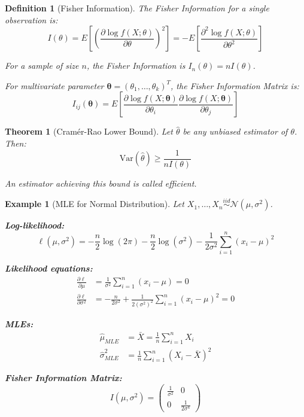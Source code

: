 \documentclass[12pt,a4paper]{article}
\newtheorem{theorem}{Theorem}[section]
\newtheorem{definition}{Definition}[section]
\newtheorem{example}{Example}[section]
\theoremstyle{remark}
\begin{document}
\begin{definition}[Fisher Information]
The Fisher Information for a single observation is:
$$I(\theta) = E\left[\left(\frac{\partial \log f(X; \theta)}{\partial \theta}\right)^2\right] = -E\left[\frac{\partial^2 \log f(X; \theta)}{\partial \theta^2}\right]$$

For a sample of size $n$, the Fisher Information is $I_n(\theta) = nI(\theta)$.

For multivariate parameter $\boldsymbol{\theta} = (\theta_1, \ldots, \theta_k)^T$, the Fisher Information Matrix is:
$$I_{ij}(\boldsymbol{\theta}) = E\left[\frac{\partial \log f(X; \boldsymbol{\theta})}{\partial \theta_i} \frac{\partial \log f(X; \boldsymbol{\theta})}{\partial \theta_j}\right]$$
\end{definition}

\begin{theorem}[Cramér-Rao Lower Bound]
Let $\hat{\theta}$ be any unbiased estimator of $\theta$. Then:
$$\text{Var}(\hat{\theta}) \geq \frac{1}{nI(\theta)}$$

An estimator achieving this bound is called efficient.
\end{theorem}

\begin{example}[MLE for Normal Distribution]
Let $X_1, \ldots, X_n \stackrel{iid}{\sim} \mathcal{N}(\mu, \sigma^2)$.

\textbf{Log-likelihood:}
$$\ell(\mu, \sigma^2) = -\frac{n}{2}\log(2\pi) - \frac{n}{2}\log(\sigma^2) - \frac{1}{2\sigma^2}\sum_{i=1}^n(x_i - \mu)^2$$

\textbf{Likelihood equations:}
\begin{align}
\frac{\partial \ell}{\partial \mu} &= \frac{1}{\sigma^2}\sum_{i=1}^n(x_i - \mu) = 0\\
\frac{\partial \ell}{\partial \sigma^2} &= -\frac{n}{2\sigma^2} + \frac{1}{2(\sigma^2)^2}\sum_{i=1}^n(x_i - \mu)^2 = 0
\end{align}

\textbf{MLEs:}
\begin{align}
\hat{\mu}_{MLE} &= \bar{X} = \frac{1}{n}\sum_{i=1}^n X_i\\
\hat{\sigma}^2_{MLE} &= \frac{1}{n}\sum_{i=1}^n(X_i - \bar{X})^2
\end{align}

\textbf{Fisher Information Matrix:}
$$I(\mu, \sigma^2) = \begin{pmatrix} \frac{1}{\sigma^2} & 0 \\ 0 & \frac{1}{2\sigma^4} \end{pmatrix}$$
\end{example}
\end{document}
